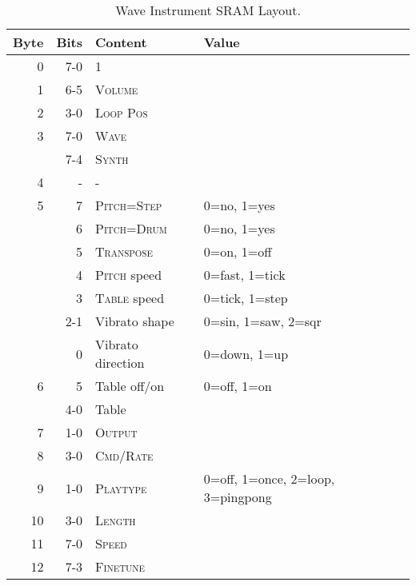 \begin{table}
	\begin{center}
		\caption{Wave Instrument SRAM Layout.}
		\begin{tabular}{r|r|l|l}
			\toprule
    Byte & Bits & Content & Value \\
    \midrule
    0  & 7-0 & 1 & \\
    1  & 6-5 & \textsc{Volume} 		& \\
    2  & 3-0 & \textsc{Loop Pos} 	& \\
    3  & 7-0 & \textsc{Wave} 		& \\
       & 7-4 & \textsc{Synth} 		& \\
    4  & -   & - & \\
    5  & 7   & \textsc{Pitch=Step} 	& 0=no, 1=yes \\
       & 6   & \textsc{Pitch=Drum} 	& 0=no, 1=yes \\
       & 5   & \textsc{Transpose} 	& 0=on, 1=off \\
       & 4   & \textsc{Pitch} speed	& 0=fast, 1=tick \\
       & 3   & \textsc{Table} speed	& 0=tick, 1=step \\
       & 2-1 & Vibrato shape		& 0=sin, 1=saw, 2=sqr \\
       & 0   & Vibrato direction	& 0=down, 1=up \\
    6  & 5   & Table off/on		& 0=off, 1=on \\
       & 4-0 & Table			& \\
    7  & 1-0 & \textsc{Output}		& \\
    8  & 3-0 & \textsc{Cmd/Rate}	& \\
    9  & 1-0 & \textsc{Playtype}	& 0=off, 1=once, 2=loop, 3=pingpong \\
    10 & 3-0 & \textsc{Length}		& \\
    11 & 7-0 & \textsc{Speed}		& \\
    12 & 7-3 & \textsc{Finetune}	& \\
    \bottomrule
		\end{tabular}
	\end{center}
\end{table}

